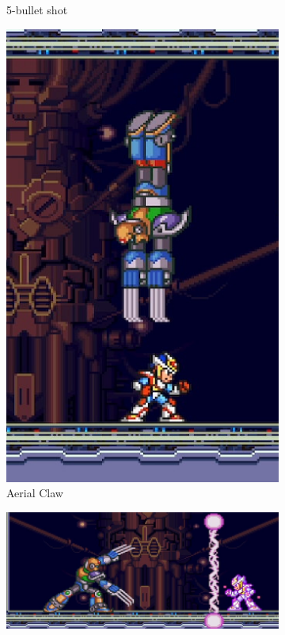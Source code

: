 \begin{figure}[htp]
\begin{minipage}{0.3\linewidth}
\begin{subfigure}{\linewidth}
			\caption{5-bullet shot}
		\end{subfigure}
	\end{minipage}
	\begin{minipage}{0.3\linewidth}		
		\begin{subfigure}{\linewidth}
			\centering
			\includegraphics[width=\linewidth]{figures/X2/Hunter_stages/Sigma_dive.png}
			\caption{Aerial Claw}
		\end{subfigure}
	\end{minipage}	
	\begin{subfigure}{0.6\linewidth}
		\centering
		\includegraphics[width=\linewidth]{figures/X2/Hunter_stages/Sigma_electric_wall.png}

\end{subfigure}
\end{figure}
